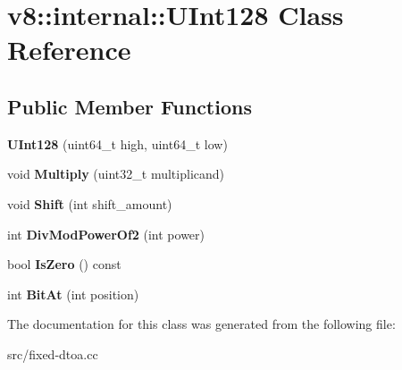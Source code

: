 \hypertarget{classv8_1_1internal_1_1_u_int128}{}\section{v8\+:\+:internal\+:\+:U\+Int128 Class Reference}
\label{classv8_1_1internal_1_1_u_int128}
\subsection*{Public Member Functions}
\begin{DoxyCompactItemize}
\item 
\hypertarget{classv8_1_1internal_1_1_u_int128_afe2e8e25543ca2fa36bf4bfbb70036f9}{}{\bfseries U\+Int128} (uint64\+\_\+t high, uint64\+\_\+t low)\label{classv8_1_1internal_1_1_u_int128_afe2e8e25543ca2fa36bf4bfbb70036f9}

\item 
\hypertarget{classv8_1_1internal_1_1_u_int128_aac3862710a8cd4c8b806ae8f6e2d0e2b}{}void {\bfseries Multiply} (uint32\+\_\+t multiplicand)\label{classv8_1_1internal_1_1_u_int128_aac3862710a8cd4c8b806ae8f6e2d0e2b}

\item 
\hypertarget{classv8_1_1internal_1_1_u_int128_ab99d0359de762cf7742b74c91b30f54f}{}void {\bfseries Shift} (int shift\+\_\+amount)\label{classv8_1_1internal_1_1_u_int128_ab99d0359de762cf7742b74c91b30f54f}

\item 
\hypertarget{classv8_1_1internal_1_1_u_int128_abd135199bd3e858d47182f6187a38723}{}int {\bfseries Div\+Mod\+Power\+Of2} (int power)\label{classv8_1_1internal_1_1_u_int128_abd135199bd3e858d47182f6187a38723}

\item 
\hypertarget{classv8_1_1internal_1_1_u_int128_a19d67a1727368dccf4e3d74601e0b547}{}bool {\bfseries Is\+Zero} () const \label{classv8_1_1internal_1_1_u_int128_a19d67a1727368dccf4e3d74601e0b547}

\item 
\hypertarget{classv8_1_1internal_1_1_u_int128_a648274c78f41bb8e940d5fc0fd54be25}{}int {\bfseries Bit\+At} (int position)\label{classv8_1_1internal_1_1_u_int128_a648274c78f41bb8e940d5fc0fd54be25}

\end{DoxyCompactItemize}


The documentation for this class was generated from the following file\+:\begin{DoxyCompactItemize}
\item 
src/fixed-\/dtoa.\+cc\end{DoxyCompactItemize}
